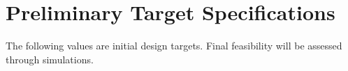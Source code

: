 
\section{Preliminary Target Specifications}

The following values are initial design targets.
Final feasibility will be assessed through simulations.

